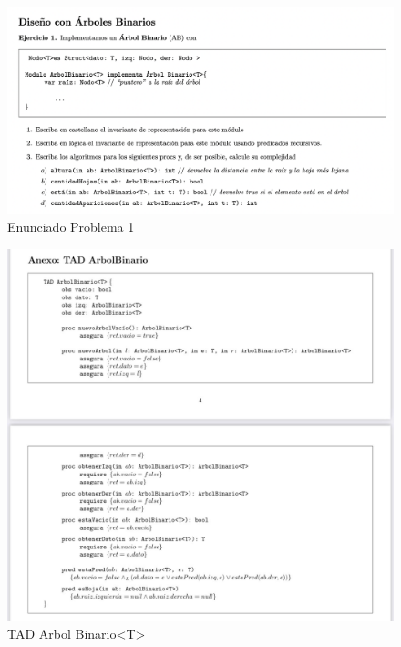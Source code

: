\documentclass[10pt,a4paper]{article}
\begin{document}

\begin{figure}[h]
  \centering
  \includegraphics[width=\textwidth]{images/guia_7_ej_1.png}
  \caption{Enunciado Problema 1}
  \label{fig:ej_1}
\end{figure}

\begin{figure}[h]
  \centering
  \includegraphics[width=\textwidth]{images/tad_arbol_binario.jpeg}
  \caption{TAD Arbol Binario<T>}
  \label{fig:tad_ab}
\end{figure}
\end{document}
